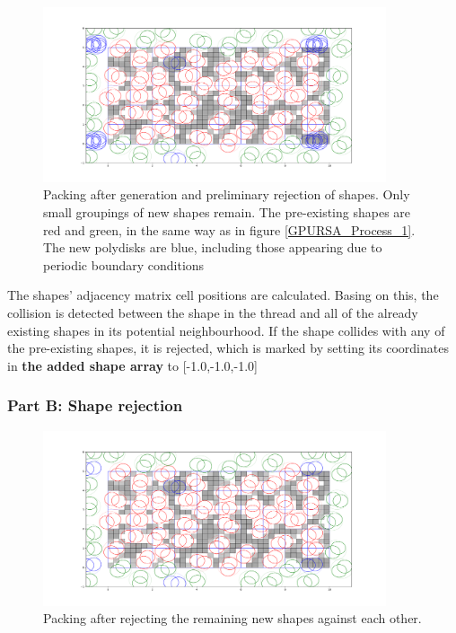 \documentclass[12pt, oneside]{report}
\begin{document}

\begin{figure}[H]
  \centering
	\includegraphics[width=0.9\textwidth,keepaspectratio]{Images/GPURSA/Figure_3.pdf}
	\caption{Packing after generation and preliminary rejection of shapes. Only small groupings of new shapes remain. The pre-existing shapes are red and green, in the same way as in figure \ref{GPURSA_Process_1}. The new polydisks are blue, including those appearing due to periodic boundary conditions}
	\label{GPURSA_Process_2}
\end{figure}

The shapes' adjacency matrix cell positions are calculated. Basing on this, the collision is detected between the shape in the thread and all of the already existing shapes in its potential neighbourhood. If the shape collides with any of the pre-existing shapes, it is rejected, which is marked by setting its coordinates in \textbf{the added shape array} to [-1.0,-1.0,-1.0]

\subsubsection{Part B: Shape rejection}

\begin{figure}[H]
  \centering
	\includegraphics[width=0.9\textwidth,keepaspectratio]{Images/GPURSA/Figure_4.pdf}
	\caption{Packing after rejecting the remaining new shapes against each other.}
	\label{GPURSA_Process_4}
\end{figure}
\end{document}
